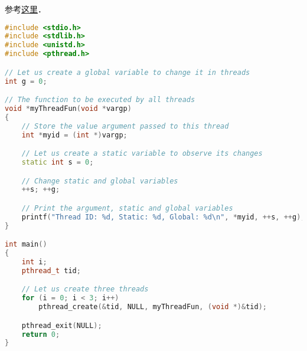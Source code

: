 
\begin{issues}
\issueDraft
\end{issues}

参考\href{https://www.geeksforgeeks.org/multithreading-c-2/}{这里}．

\begin{lstlisting}[language=cpp]
#include <stdio.h>
#include <stdlib.h>
#include <unistd.h>
#include <pthread.h>

// Let us create a global variable to change it in threads
int g = 0;

// The function to be executed by all threads
void *myThreadFun(void *vargp)
{
	// Store the value argument passed to this thread
	int *myid = (int *)vargp;

	// Let us create a static variable to observe its changes
	static int s = 0;

	// Change static and global variables
	++s; ++g;

	// Print the argument, static and global variables
	printf("Thread ID: %d, Static: %d, Global: %d\n", *myid, ++s, ++g);
}

int main()
{
	int i;
	pthread_t tid;

	// Let us create three threads
	for (i = 0; i < 3; i++)
		pthread_create(&tid, NULL, myThreadFun, (void *)&tid);

	pthread_exit(NULL);
	return 0;
}
\end{lstlisting}
